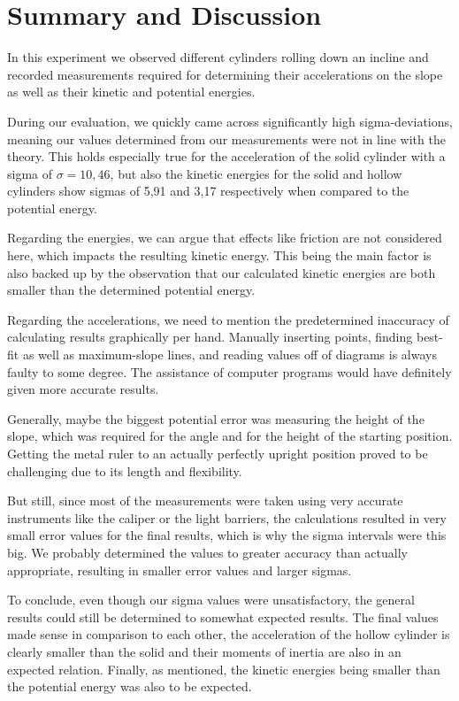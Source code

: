 \documentclass{article}
\begin{document}
\newpage
\section{Summary and Discussion}

In this experiment we observed different cylinders rolling down an incline and recorded measurements required for determining their accelerations on the slope as well as their kinetic and potential energies. 

During our evaluation, we quickly came across significantly high sigma-deviations, meaning our values determined from our measurements were not in line with the theory. This holds especially true for the acceleration of the solid cylinder with a sigma of $\sigma = 10,46$, but also the kinetic energies for the solid and hollow cylinders show sigmas of 5,91 and 3,17 respectively when compared to the potential energy.

Regarding the energies, we can argue that effects like friction are not considered here, which impacts the resulting kinetic energy. This being the main factor is also backed up by the observation that our calculated kinetic energies are both smaller than the determined potential energy. 

Regarding the accelerations, we need to mention the predetermined inaccuracy of calculating results graphically per hand. Manually inserting points, finding best-fit as well as maximum-slope lines, and reading values off of diagrams is always faulty to some degree. The assistance of computer programs would have definitely given more accurate results. 

Generally, maybe the biggest potential error was measuring the height of the slope, which was required for the angle and for the height of the starting position. Getting the metal ruler to an actually perfectly upright position proved to be challenging due to its length and flexibility.

But still, since most of the measurements were taken using very accurate instruments like the caliper or the light barriers, the calculations resulted in very small error values for the final results, which is why the sigma intervals were this big. We probably determined the values to greater accuracy than actually appropriate, resulting in smaller error values and larger sigmas.

To conclude, even though our sigma values were unsatisfactory, the general results could still be determined to somewhat expected results. The final values made sense in comparison to each other, the acceleration of the hollow cylinder is clearly smaller than the solid and their moments of inertia are also in an expected relation. Finally, as mentioned, the kinetic energies being smaller than the potential energy was also to be expected. 
\end{document}

